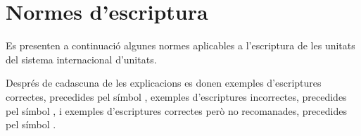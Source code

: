 \section{Normes d'escriptura}\label{sec:normes-escript}

Es presenten a continuació algunes normes aplicables a l'escriptura
de les unitats del sistema internacional d'unitats.

Després de cadascuna de les explicacions es donen exemples d'escriptures correctes, precedides pel símbol \textcolor{Green}\faCheckSquare{}, exemples d'escriptures  incorrectes,  precedides pel símbol \textcolor{Red}\faTimesCircle{}, i exemples d'escriptures correctes però no recomanades, precedides pel símbol
\textcolor{Blue}\faExclamationTriangle{}.

